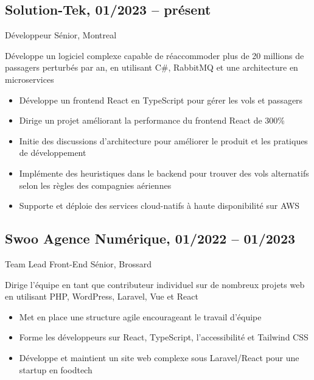 \documentclass{article}
\begin{document}
\begin{paracol}{2}
\begin{rightcolumn}
    \subsection{Solution-Tek, 01/2023 -- présent}
    {Développeur Sénior, Montreal\par}
    {
      Développe un logiciel complexe capable de réaccommoder plus de 20 millions de passagers perturbés par an, en utilisant C\#, RabbitMQ et une architecture en microservices
    \par}
    \begin{itemize}
      \item Développe un frontend React en TypeScript pour gérer les vols et passagers
      \item Dirige un projet améliorant la performance du frontend React de 300\%
      \item Initie des discussions d’architecture pour améliorer le produit et les pratiques de développement
      \item Implémente des heuristiques dans le backend pour trouver des vols alternatifs selon les règles des compagnies aériennes
      \item Supporte et déploie des services cloud-natifs à haute disponibilité sur AWS
    \end{itemize}

    \vspace{1em}

    \subsection{Swoo Agence Numérique, 01/2022 -- 01/2023}
    {Team Lead Front-End Sénior, Brossard\par}
    {
      Dirige l’équipe en tant que contributeur individuel sur de nombreux projets web en utilisant PHP, WordPress, Laravel, Vue et React
    \par}
    \begin{itemize}
      \item Met en place une structure agile encourageant le travail d’équipe
      \item Forme les développeurs sur React, TypeScript, l’accessibilité et Tailwind CSS
      \item Développe et maintient un site web complexe sous Laravel/React pour une startup en foodtech
    \end{itemize}


\end{rightcolumn}
\end{paracol}
\end{document}
